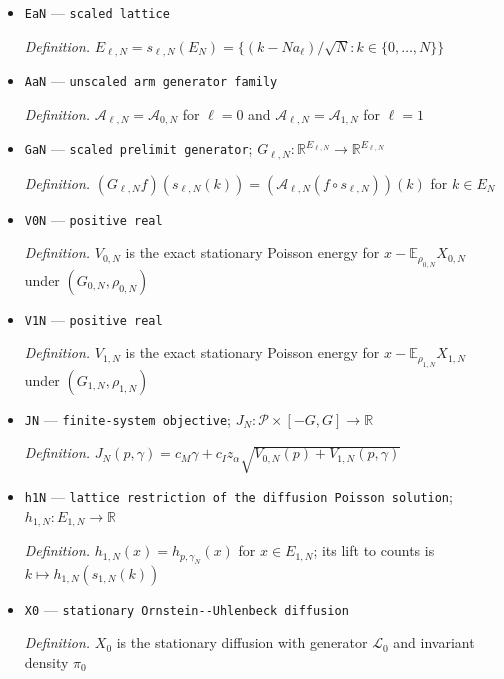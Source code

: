 \documentclass{article}
\begin{document}
\begin{itemize}
  \par\smallskip\noindent\emph{Definition.} \(X_{\ell,N}(t)=(Q_{\ell,N}(t)-Na_\ell)/\sqrt N=s_{\ell,N}(Q_{\ell,N}(t))\)
  \item \texttt{EaN} --- \texttt{scaled lattice}
  \par\smallskip\noindent\emph{Definition.} \(E_{\ell,N}=s_{\ell,N}(E_N)=\{(k-Na_\ell)/\sqrt N:k\in\{0,\ldots,N\}\}\)
  \item \texttt{AaN} --- \texttt{unscaled arm generator family}
  \par\smallskip\noindent\emph{Definition.} \(\mathcal A_{\ell,N}=\mathcal A_{0,N}\) for \(\ell=0\) and \(\mathcal A_{\ell,N}=\mathcal A_{1,N}\) for \(\ell=1\)
  \item \texttt{GaN} --- \texttt{scaled prelimit generator}; \(G_{\ell,N}:\mathbb R^{E_{\ell,N}}\to\mathbb R^{E_{\ell,N}}\)
  \par\smallskip\noindent\emph{Definition.} \((G_{\ell,N}f)(s_{\ell,N}(k))=(\mathcal A_{\ell,N}(f\circ s_{\ell,N}))(k)\) for \(k\in E_N\)
  \item \texttt{V0N} --- \texttt{positive real}
  \par\smallskip\noindent\emph{Definition.} \(V_{0,N}\) is the exact stationary Poisson energy for \(x-\mathbb E_{\rho_{0,N}}X_{0,N}\) under \((G_{0,N},\rho_{0,N})\)
  \item \texttt{V1N} --- \texttt{positive real}
  \par\smallskip\noindent\emph{Definition.} \(V_{1,N}\) is the exact stationary Poisson energy for \(x-\mathbb E_{\rho_{1,N}}X_{1,N}\) under \((G_{1,N},\rho_{1,N})\)
  \item \texttt{JN} --- \texttt{finite-\allowbreak{}system objective}; \(J_N:\mathcal P\times[-G,G]\to\mathbb R\)
  \par\smallskip\noindent\emph{Definition.} \(J_N(p,\gamma)=c_M\gamma+c_Iz_\alpha\sqrt{V_{0,N}(p)+V_{1,N}(p,\gamma)}\)
  \item \texttt{h1N} --- \texttt{lattice restriction of the diffusion Poisson solution}; \(h_{1,N}:E_{1,N}\to\mathbb R\)
  \par\smallskip\noindent\emph{Definition.} \(h_{1,N}(x)=h_{p,\gamma_N}(x)\) for \(x\in E_{1,N}\); its lift to counts is \(k\mapsto h_{1,N}(s_{1,N}(k))\)
  \item \texttt{X0} --- \texttt{stationary Ornstein-\allowbreak{}-\allowbreak{}Uhlenbeck diffusion}
  \par\smallskip\noindent\emph{Definition.} \(X_0\) is the stationary diffusion with generator \(\mathcal L_0\) and invariant density \(\pi_0\)

\end{itemize}
\end{document}
